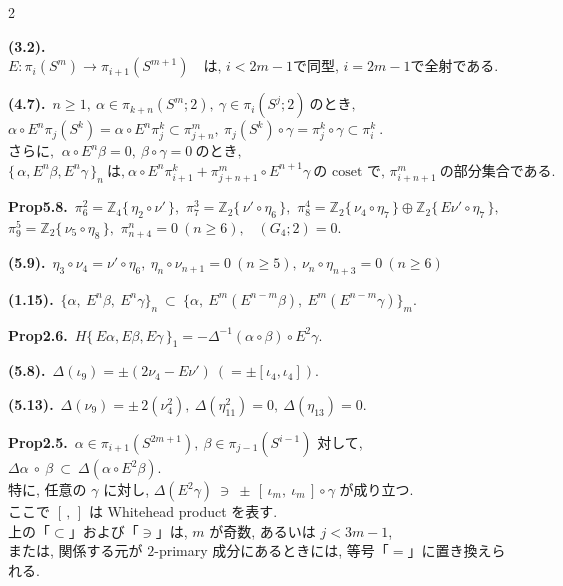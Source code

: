 \documentclass[10pt, leqno]{ltjsarticle}
\newcommand{\Ex}{E}        %
\newcommand{\todai}[2][]{\{\,#2\,\}_{#1}}      %
\newcommand{\gen}[1]{\{\,#1\,\}}       %
\newcommand{\pis}[2]{\pi_{#1}(#2)}       %
\newcommand{\pit}[2]{\pi_{#1}^{#2}}
\numberwithin{equation}{section}
\theoremstyle{plain}
\theoremstyle{definition}
\theoremstyle{remark}
\begin{document}
\begin{paracol}{2}
\switchcolumn

\noindent
\textbf{(3.2).}\
\(\Ex: \pis{i}{S^m} \longrightarrow \pis{i+1}{S^{m+1}}
\quad\text{は, } i<2m-1 \text{で同型, } i=2m-1 \text{で全射である. }\)

\noindent
\textbf{(4.7).}\
\(n\ge1, \ \alpha\in\pis{k+n}{S^m; 2},\ \gamma\in\pis{i}{S^j; 2}
    \ \text{のとき, }\)\\
\(\alpha\circ E^n\pis{j}{S^k} = \alpha\circ E^n \pit{j}{k}
  \subset \pit{j+n}{m},
  \ \pis{j}{S^k}\circ\gamma = \pit{j}{k}\circ\gamma \subset\pit{i}{k}\ . \)\\
\(\text{さらに, }\ \alpha\circ E^n\beta=0,\ \beta\circ\gamma = 0 \ \text{のとき, }\)\\
\(\todai[n]{\alpha, E^n\beta, E^n\gamma}\ \text{は,}\
  \alpha\circ E^n\pit{i+1}{k} + \pit{j+n+1}{m}\circ E^{n+1}\gamma\
  \text{の coset で, }\pit{i+n+1}{m} \ \text{の部分集合である. }\)

\noindent
\textbf{Prop5.8.}\
\(\pi^{2}_{6}=\mathbb Z_4\gen{\eta_{2}\circ\nu'},\) \quad
\(\pi^{3}_{7}=\mathbb Z_2\gen{\nu'\circ\eta_6},\) \quad
\(\pi^{4}_{8}=\mathbb Z_2\gen{\nu_{4}\circ\eta_7}\oplus \mathbb Z_2\gen{E\nu'\circ\eta_7},\) \\
\(\pi^{5}_{9}=\mathbb Z_2\gen{\nu_{5}\circ\eta_8},\) \quad
\(\pi^{n}_{n+4}=0\ (n\ge6),\) \
\((G_{4};2)=0.\)

\noindent
\textbf{(5.9).}\
\(\eta_3\circ \nu_4= \nu'\circ \eta_6,\
\eta_n\circ \nu_{n+1}=0\ (n\ge5),\
\nu_n\circ \eta_{n+3}=0\ (n\ge6)\)

\noindent
\textbf{(1.15).}\
\(\{\alpha,\ \Ex^n\beta,\ \Ex^n\gamma\}_n
\ \subset\
\bigl\{\alpha,\ \Ex^{m}(E^{n-m}\beta),\ E^{m}(E^{n-m}\gamma)\bigr\}_m .\)

\noindent
\textbf{Prop2.6.}\
\(H\todai[1]{E\alpha, E\beta, E\gamma} 
= -\Delta^{-1}(\alpha\circ\beta)\circ E^2\gamma.\)

\noindent
\textbf{(5.8).}\
\(\Delta(\iota_9)=\pm(2\nu_4-E\nu')  \ (=\pm[\iota_4, \iota_4]) .\)

\noindent
\textbf{(5.13).}\
\(\Delta(\nu_9)=\pm\,2(\nu_4^{2}),\
\Delta(\eta^{2}_{11})=0,\
\Delta(\eta_{13})=0.\)

\noindent
\textbf{Prop2.5.}\
$\alpha\in\pi_{i+1}(S^{2m+1}), \ \beta\in \pi_{j-1}(S^{i-1})$ 対して, 
\(
\Delta\alpha\ \circ\ \beta\ \subset\ \Delta(\alpha\circ E^2\beta).
\)\\
特に, 任意の $\gamma$ に対し,
\(
\Delta(E^2\gamma)\ \ni\ \pm\,[\,\iota_m,\ \iota_m\,]\circ\gamma
\)
が成り立つ. \\
ここで $[\, ,\,]$ は Whitehead product を表す. \\
上の「$\subset$」および「$\ni$」は, $m$ が奇数, 
あるいは $j<3m-1$, \\
または, 関係する元が \(2\)-primary 成分にあるときには, 
等号「$=$」に置き換えられる. 


\end{paracol}
\end{document}
